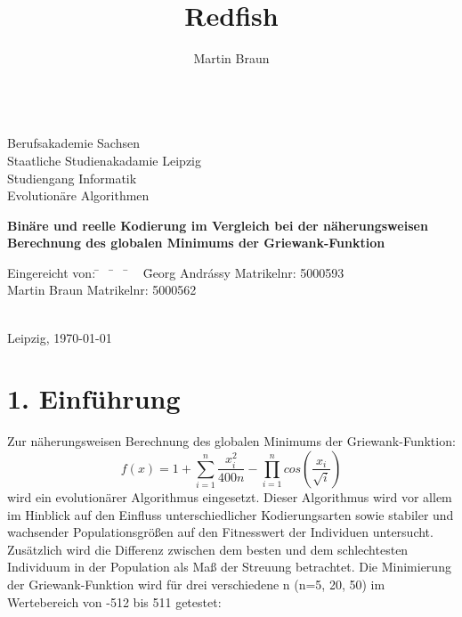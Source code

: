 \documentclass[12pt,
    a4paper,
    headinclude,
    footinclude]{scrreprt}
\author{Martin Braun}
\title{Redfish}
\begin{document}
	\onehalfspacing
	\monthyearsepgerman{\,}{\,}
	\setcounter{tocdepth}{2}
	

	
	\begin{titlepage}
	
		\begin{center}
			~\\[2cm]
			Berufsakademie Sachsen \\
			Staatliche Studienakadamie Leipzig \\
			Studiengang Informatik \\
           	Evolutionäre Algorithmen\\ [2.4cm]
           
			\begin{Large}
			    \textbf{Binäre und reelle Kodierung im Vergleich bei der näherungsweisen Berechnung des globalen Minimums der Griewank-Funktion} \\[2.4cm]
			\end{Large}
			
			\doublespacing


		\end{center}
		\onehalfspacing
		\begin{tabbing}
			Eingereicht von: \= ~ \= ~ \= ~ \= Georg Andrássy \hspace*{3cm} Matrikelnr: 5000593  \\
			\> \> \> \> Martin Braun \hspace*{3.4cm} Matrikelnr: 5000562 \\
			\\

		\end{tabbing}
		\vspace*{\fill}
		Leipzig, \today
		
	\end{titlepage}
    
    \clearpage
        
    \setcounter{page}{2}
    
\section*{1. Einführung}	\onehalfspacing

Zur näherungsweisen Berechnung des globalen Minimums der Griewank-Funktion: \[f(x) = 1 +  \sum_{i=1}^n \frac{x_i^{2}}{400n} -  \prod \limits_{i=1}^n cos \left(\frac{x_i}{\sqrt{i}}\right)\] wird ein evolutionärer Algorithmus eingesetzt. Dieser Algorithmus wird vor allem im Hinblick auf den Einfluss  unterschiedlicher Kodierungsarten sowie stabiler und wachsender Populationsgrößen auf den Fitnesswert der Individuen untersucht. Zusätzlich wird die Differenz zwischen dem besten und dem schlechtesten Individuum in der Population als Maß der Streuung betrachtet. Die Minimierung der Griewank-Funktion wird für drei verschiedene n (n=5, 20, 50) im Wertebereich von -512 bis 511 getestet:
\end{document}
